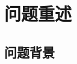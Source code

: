 \documentclass{whutmod}
\begin{document}
%
%
%
%
%
%
%

\section{问题重述}
\subsection{问题背景}
\end{document}
